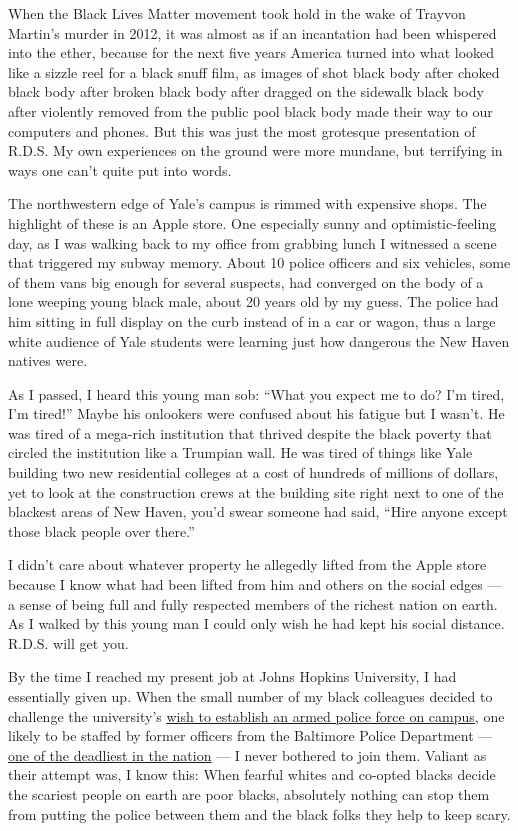 When the Black Lives Matter movement took hold in the wake of Trayvon
Martin's murder in 2012, it was almost as if an incantation had been
whispered into the ether, because for the next five years America turned
into what looked like a sizzle reel for a black snuff film, as images of
shot black body after choked black body after broken black body after
dragged on the sidewalk black body after violently removed from the
public pool black body made their way to our computers and phones. But
this was just the most grotesque presentation of R.D.S. My own
experiences on the ground were more mundane, but terrifying in ways one
can't quite put into words.

The northwestern edge of Yale's campus is rimmed with expensive shops.
The highlight of these is an Apple store. One especially sunny and
optimistic-feeling day, as I was walking back to my office from grabbing
lunch I witnessed a scene that triggered my subway memory. About 10
police officers and six vehicles, some of them vans big enough for
several suspects, had converged on the body of a lone weeping young
black male, about 20 years old by my guess. The police had him sitting
in full display on the curb instead of in a car or wagon, thus a large
white audience of Yale students were learning just how dangerous the New
Haven natives were.

As I passed, I heard this young man sob: ``What you expect me to do? I'm
tired, I'm tired!'' Maybe his onlookers were confused about his fatigue
but I wasn't. He was tired of a mega-rich institution that thrived
despite the black poverty that circled the institution like a Trumpian
wall. He was tired of things like Yale building two new residential
colleges at a cost of hundreds of millions of dollars, yet to look at
the construction crews at the building site right next to one of the
blackest areas of New Haven, you'd swear someone had said, ``Hire anyone
except those black people over there.''

I didn't care about whatever property he allegedly lifted from the Apple
store because I know what had been lifted from him and others on the
social edges --- a sense of being full and fully respected members of
the richest nation on earth. As I walked by this young man I could only
wish he had kept his social distance. R.D.S. will get you.

By the time I reached my present job at Johns Hopkins University, I had
essentially given up. When the small number of my black colleagues
decided to challenge the university's
\href{https://publicsafetyinitiatives.jhu.edu/assets/uploads/sites/8/2019/01/proposal_summary.pdf}{wish
to establish an armed police force on campus}, one likely to be staffed
by former officers from the Baltimore Police Department ---
\href{https://mappingpoliceviolence.org/compare-police-departments}{one
of the deadliest in the nation} --- I never bothered to join them.
Valiant as their attempt was, I know this: When fearful whites and
co-opted blacks decide the scariest people on earth are poor blacks,
absolutely nothing can stop them from putting the police between them
and the black folks they help to keep scary.

